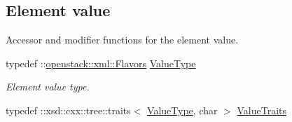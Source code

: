 \subsection*{Element value}
\label{_amgrp2ee2eae1a8c390ea033f241c027da8d6}
Accessor and modifier functions for the element value. \begin{DoxyCompactItemize}
\item 
\hypertarget{classopenstack_1_1xml_1_1Flavors___a8b8f8f264f99e580c482c0a65697e522}{
typedef ::\hyperlink{classopenstack_1_1xml_1_1Flavors}{openstack::xml::Flavors} \hyperlink{classopenstack_1_1xml_1_1Flavors___a8b8f8f264f99e580c482c0a65697e522}{ValueType}}
\label{classopenstack_1_1xml_1_1Flavors___a8b8f8f264f99e580c482c0a65697e522}

\begin{DoxyCompactList}\small\item\em Element value type. \item\end{DoxyCompactList}\item 
\hypertarget{classopenstack_1_1xml_1_1Flavors___a30daa383fb27302787bf10347343ab12}{
typedef ::xsd::cxx::tree::traits$<$ \hyperlink{classopenstack_1_1xml_1_1Flavors}{ValueType}, char $>$ \hyperlink{classopenstack_1_1xml_1_1Flavors___a30daa383fb27302787bf10347343ab12}{ValueTraits}}
\label{classopenstack_1_1xml_1_1Flavors___a30daa383fb27302787bf10347343ab12}


\end{DoxyCompactItemize}
